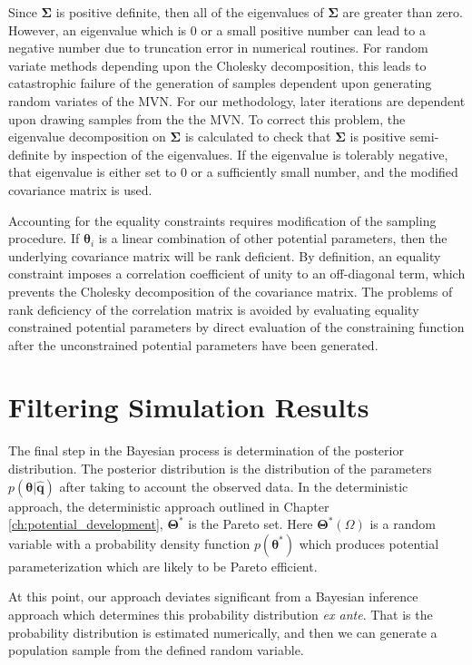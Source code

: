 Since $\bm{\Sigma}$ is positive definite, then all of the eigenvalues of $\bm{\Sigma}$ are greater than zero.  However, an eigenvalue which is 0 or a small positive number can lead to a negative number due to truncation error in numerical routines.  For random variate methods depending upon the Cholesky decomposition, this leads to catastrophic failure of the generation of samples dependent upon generating random variates of the MVN.  For our methodology, later iterations are dependent upon drawing samples from the the MVN.  To correct this problem, the eigenvalue decomposition on $\bm{\Sigma}$ is calculated to check that $\bm{\Sigma}$ is positive semi-definite by inspection of the eigenvalues.  If the eigenvalue is tolerably negative, that eigenvalue is either set to $0$ or a sufficiently small number, and the modified covariance matrix is used.

Accounting for the equality constraints requires modification of the sampling procedure.  If $\bm{\theta}_i$ is a linear combination of other potential parameters, then the underlying covariance matrix will be rank deficient.  By definition, an equality constraint imposes a correlation coefficient of unity to an off-diagonal term, which prevents the Cholesky decomposition of the covariance matrix.  The problems of rank deficiency of the correlation matrix is avoided by evaluating equality constrained potential parameters by direct evaluation of the constraining function after the unconstrained potential parameters have been generated.

\section{Filtering Simulation Results}
\label{sec:filtering}

The final step in the Bayesian process is determination of the posterior distribution.  The posterior distribution is the distribution of the parameters $p(\bm{\theta}|\hat{\bm{q}})$ after taking to account the observed data.  In the deterministic approach, the deterministic approach outlined in Chapter \ref{ch:potential_development}, $\bm{\Theta}^*$ is the Pareto set.  Here $\bm{\Theta}^*(\Omega)$ is a random variable with a probability density function $p(\bm{\theta}^*)$ which produces potential parameterization which are likely to be Pareto efficient.

At this point, our approach deviates significant from a Bayesian inference approach which determines this probability distribution \emph{ex ante}.  That is the probability distribution is estimated numerically, and then we can generate a population sample from the defined random variable.

